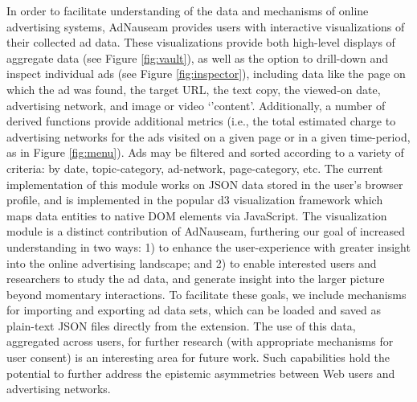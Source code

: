 \documentclass[conference]{IEEEtran}
\begin{document}
In order to facilitate understanding of the data and mechanisms of online advertising systems, AdNauseam provides users with interactive visualizations of their collected ad data. These visualizations provide both high-level displays of aggregate data (see Figure \ref{fig:vault}), as well as the option to drill-down and inspect individual ads (see Figure \ref{fig:inspector}), including data like the page on which the ad was found, the target URL, the text copy, the viewed-on date, advertising network, and image or video `'content'. Additionally, a number of derived functions provide additional metrics (i.e., the total estimated charge to advertising networks for the ads visited on a given page or in a given time-period, as in Figure \ref{fig:menu}). Ads may be filtered and sorted according to a variety of criteria: by date, topic-category, ad-network, page-category, etc. The current implementation of this module works on JSON data stored in the user's browser profile, and is implemented in the popular d3 visualization framework which maps data entities to native DOM elements via JavaScript.
The visualization module is a distinct contribution of AdNauseam, furthering our goal of increased understanding in two ways: 1) to enhance the user-experience with greater insight into the online advertising landscape; and 2) to enable interested users and researchers to study the ad data, and generate insight into the larger picture beyond momentary interactions. To facilitate these goals, we include mechanisms for importing and exporting ad data sets, which can be loaded and saved as plain-text JSON files directly from the extension. The use of this data, aggregated across users, for further research (with appropriate mechanisms for user consent) is an interesting area for future work. Such capabilities hold the potential to further address the epistemic asymmetries between Web users and advertising networks.
\end{document}
